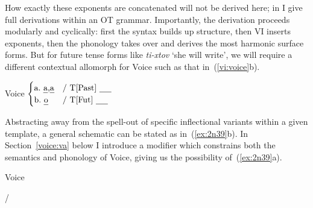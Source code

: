 \begin{exe}
\begin{xlist}
\begin{exe}
\begin{xlist}
\begin{exe}
\begin{xlist}
\begin{exe}
\begin{exe}
\begin{xlist}
\begin{exe}
\begin{xlist}
\begin{exe}
\begin{xlist}
\begin{exe}
\begin{xlist}
\begin{exe}
\begin{xlist}
\begin{exe}
\begin{xlist}
\begin{exe}
\begin{xlist}
\begin{exe}
\begin{xlist}
\begin{xlist}
\begin{exe}
\begin{xlist}
\begin{exe}
\begin{xlist}
\begin{exe}
\begin{xlist}
\begin{exe}
\begin{xlist}
\begin{exe}
\begin{xlist}
\begin{exe}
\begin{xlist}
\begin{exe}
\begin{xlist}
\begin{exe}
\begin{xlist}
\begin{exe}
\begin{xlist}
\begin{exe}
\begin{xlist}
\begin{exe}
\begin{xlist}
\begin{exe}
\begin{xlist}
\begin{xlist}
\begin{xlist}
\begin{exe}
\begin{xlist}
\begin{xlist}
\begin{xlist}
How exactly these exponents are concatenated will not be derived here; in \cite{kastner18nllt} I give full derivations within an OT grammar. Importantly, the derivation proceeds modularly and cyclically: first the syntax builds up structure, then VI inserts exponents, then the phonology takes over and derives the most harmonic surface forms. But for future tense forms like \emph{ti-xtov} `she will write', we will require a different contextual allomorph for Voice such as that in~(\ref{vi:voice}b).

 \begin{exe}
\ex  \label{vi:voice} Voice \lra $\begin{cases} 
		\text{a.~\emph{a},\emph{a}} & \text{/ T[Past] \trace}\\
		\text{b.~\emph{o}} & \text{/ T[Fut] \trace}\\
		\end{cases}$
 \z 

Abstracting away from the spell-out of specific inflectional variants within a given template, a general schematic can be stated as in~(\ref{ex:2n39}b). In Section~\ref{voice:va} below I introduce a modifier which constrains both the semantics and phonology of Voice, giving us the possibility of~(\ref{ex:2n39}a).\largerpage[-1]

 \begin{exe}
 \ex  \label{ex:2n39}Voice {\lra} 
 \begin{xlist} 
 	\ex   {\tpie} / {\trace} {\va} 
 	\ex   {\tkal} 
 \z
\z 


\end{xlist}
\end{exe}
\end{exe}
\end{xlist}
\end{xlist}
\end{xlist}
\end{exe}
\end{xlist}
\end{xlist}
\end{xlist}
\end{exe}
\end{xlist}
\end{exe}
\end{xlist}
\end{exe}
\end{xlist}
\end{exe}
\end{xlist}
\end{exe}
\end{xlist}
\end{exe}
\end{xlist}
\end{exe}
\end{xlist}
\end{exe}
\end{xlist}
\end{exe}
\end{xlist}
\end{exe}
\end{xlist}
\end{exe}
\end{xlist}
\end{exe}
\end{xlist}
\end{xlist}
\end{exe}
\end{xlist}
\end{exe}
\end{xlist}
\end{exe}
\end{xlist}
\end{exe}
\end{xlist}
\end{exe}
\end{xlist}
\end{exe}
\end{xlist}
\end{exe}
\end{xlist}
\end{exe}
\end{exe}
\end{xlist}
\end{exe}
\end{xlist}
\end{exe}
\end{xlist}
\end{exe}
